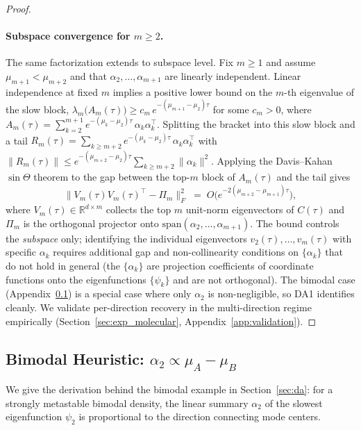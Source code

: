 \documentclass{article}
\newcommand{\R}{\mathbb{R}}
\begin{document}
\begin{proof}
\paragraph{Subspace convergence for $m \geq 2$.}
The same factorization extends to subspace level. Fix $m \geq 1$ and assume $\mu_{m+1} < \mu_{m+2}$ and that $\alpha_2, \ldots, \alpha_{m+1}$ are linearly independent. Linear independence at fixed $m$ implies a positive lower bound on the $m$-th eigenvalue of the slow block,
$\lambda_m\bigl(A_m(\tau)\bigr) \geq c_m\,e^{-(\mu_{m+1} - \mu_2)\tau}$ for some $c_m > 0$, where
$A_m(\tau) = \sum_{k=2}^{m+1} e^{-(\mu_k - \mu_2)\tau}\,\alpha_k\alpha_k^\top$.
Splitting the bracket into this slow block and a tail
$R_m(\tau) = \sum_{k \geq m+2} e^{-(\mu_k - \mu_2)\tau}\,\alpha_k\alpha_k^\top$
with $\|R_m(\tau)\| \leq e^{-(\mu_{m+2} - \mu_2)\tau}\sum_{k \geq m+2}\|\alpha_k\|^2$.
Applying the Davis--Kahan $\sin\Theta$ theorem to the gap between the top-$m$
block of $A_m(\tau)$ and the tail gives
\[
\|V_m(\tau)V_m(\tau)^\top - \Pi_m\|_F^2 \;=\; O\bigl(e^{-2(\mu_{m+2} - \mu_{m+1})\tau}\bigr),
\]
where $V_m(\tau) \in \R^{d \times m}$ collects the top $m$ unit-norm
eigenvectors of $C(\tau)$ and $\Pi_m$ is the orthogonal projector onto
$\mathrm{span}(\alpha_2, \ldots, \alpha_{m+1})$. The bound controls the
\emph{subspace} only; identifying the individual eigenvectors
$v_2(\tau), \ldots, v_m(\tau)$ with specific $\alpha_k$ requires
additional gap and non-collinearity conditions on $\{\alpha_k\}$ that
do not hold in general (the $\{\alpha_k\}$ are projection coefficients
of coordinate functions onto the eigenfunctions $\{\psi_k\}$ and are
not orthogonal). The bimodal case (Appendix~\ref{app:bimodal_heuristic})
is a special case where only $\alpha_2$ is non-negligible, so DA1
identifies cleanly. We validate per-direction recovery in the
multi-direction regime empirically (Section~\ref{sec:exp_molecular},
Appendix~\ref{app:validation}).
\end{proof}

\subsection{Bimodal Heuristic: $\alpha_2 \propto \mu_A - \mu_B$}
\label{app:bimodal_heuristic}

We give the derivation behind the bimodal example in
Section~\ref{sec:da}: for a strongly metastable bimodal density, the
linear summary $\alpha_2$ of the slowest eigenfunction $\psi_2$ is
proportional to the direction connecting mode centers.
\end{document}
